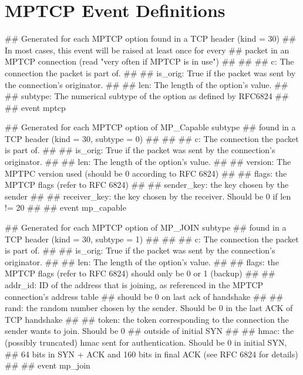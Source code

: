 
\chapter{MPTCP Event Definitions} \label{append:event}
\begin{code}

## Generated for each MPTCP option found in a TCP header (kind = 30) 
## In most cases, this event will be raised at least once for every
## packet in an MPTCP connection (read "very often if MPTCP is in use")
##
##
## c: The connection the packet is part of.
##
## is_orig: True if the packet was sent by the connection's originator.
##
## len: The length of the option's value.
##
## subtype: The numerical subtype of the option as defined by RFC6824
##
## 
event mptcp%

\end{code}

\begin{code}

## Generated for each MPTCP option of MP_Capable subtype
## found in a TCP header (kind = 30, subtype = 0) 
## 
##
## c: The connection the packet is part of.
##
## is_orig: True if the packet was sent by the connection's originator.
##
## len: The length of the option's value.
##
## version: The MPTPC version used (should be 0 according to RFC 6824)
##
## flags: the MPTCP flags (refer to RFC 6824)
##
## sender_key: the key chosen by the sender
##
## receiver_key: the key chosen by the receiver. Should be 0 if len != 20
##
## 
event mp_capable%

\end{code}

\begin{code}

## Generated for each MPTCP option of MP_JOIN subtype
## found in a TCP header (kind = 30, subtype = 1) 
## 
##
## c: The connection the packet is part of.
##
## is_orig: True if the packet was sent by the connection's originator.
##
## len: The length of the option's value.
##
## flags: the MPTCP flags (refer to RFC 6824) should only be 0 or 1 (backup)
##
## addr_id: ID of the address that is joining, as referenced in the MPTCP connection's address table
##      should be 0 on last ack of handshake
##
## rand: the random number chosen by the sender. Should be 0 in the last ACK of TCP handshake
##
## token: the token corresponding to the connection the sender wants to join. Should be 0
##			outside of initial SYN
##
## hmac: the (possibly truncated) hmac sent for authentication. Should be 0 in initial SYN,
##			64 bits in SYN + ACK and 160 bits in final ACK (see RFC 6824 for details)
##
## 
event mp_join%

\end{code}

